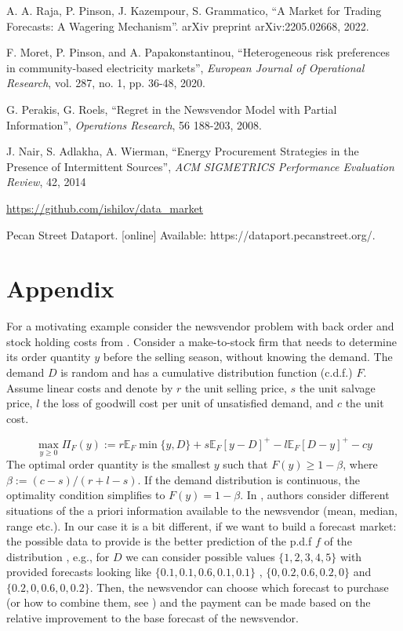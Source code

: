 \documentclass{article}
\begin{document}
\begin{thebibliography}{}

 A. A. Raja, P. Pinson, J. Kazempour, S. Grammatico, ``A Market for Trading Forecasts: A Wagering Mechanism''. arXiv preprint arXiv:2205.02668, 2022.

 F. Moret, P. Pinson, and A. Papakonstantinou, ``Heterogeneous risk preferences in community-based electricity markets'', {\it European Journal of Operational Research}, vol. 287, no. 1, pp. 36-48, 2020. 

 G. Perakis, G. Roels, ``Regret in the Newsvendor Model with Partial Information'', {\it Operations Research}, 56 188-203, 2008.

 J. Nair, S. Adlakha, A. Wierman, ``Energy Procurement Strategies in the Presence of Intermittent Sources'', {\it ACM SIGMETRICS Performance Evaluation Review}, 42, 2014

 \url{https://github.com/ishilov/data_market}

 Pecan Street Dataport. [online] Available: https://dataport.pecanstreet.org/.

\end{thebibliography}

\newpage
\section{Appendix}\label{section: appendix}
For a motivating example consider the newsvendor problem with back order and stock holding costs from \cite{perakis}. Consider a make-to-stock firm that needs to determine its order quantity $y$ before the selling season, without knowing the demand. The demand $D$ is random and has a cumulative distribution function (c.d.f.) $F$. Assume linear costs and denote by $r$ the unit selling price, $s$ the unit salvage price, $l$ the loss of goodwill cost per unit of unsatisfied demand, and $c$ the unit cost. 

\begin{equation*}
    \max_{y \geq 0 } \Pi_F(y) := r \mathbb{E}_F \min\{y,D\} + s \mathbb{E}_F [y - D]^+ - l \mathbb{E}_F [D-y]^+ - c y
\end{equation*}
The optimal order quantity is the smallest $y$ such that $F(y) \geq 1 - \beta$, where $\beta := (c - s) / (r + l - s)$. If the demand distribution is continuous, the optimality condition simplifies to $F(y) = 1 - \beta$. In \cite{perakis}, authors consider different situations of the a priori information available to the newsvendor (mean, median, range etc.). In our case it is a bit different, if we want to build a forecast market: the possible data to provide is the better prediction of the p.d.f $f$ of the distribution \cite{raja}, e.g., for $D$ we can consider possible values $\{1, 2, 3, 4, 5 \}$ with provided forecasts looking like $\{0.1, 0.1, 0.6, 0.1, 0.1\}$ , $\{0, 0.2, 0.6, 0.2, 0\}$ and $\{0.2, 0, 0.6, 0, 0.2\}$. Then, the newsvendor can choose which forecast to purchase (or how to combine them, see \cite{raja}) and the payment can be made based on the relative improvement to the base forecast of the newsvendor.
\end{document}
